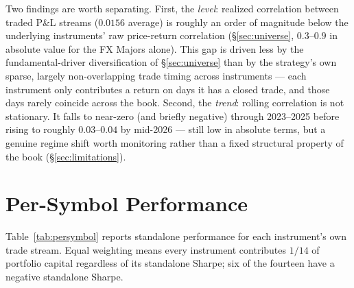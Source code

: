 \documentclass[11pt]{article}
\begin{document}
Two findings are worth separating. First, the \emph{level}: realized correlation between traded P\&L
streams ($0.0156$ average) is roughly an order of magnitude below the underlying instruments' raw
price-return correlation (\S\ref{sec:universe}, $0.3$--$0.9$ in absolute value for the FX Majors
alone). This gap is driven less by the fundamental-driver diversification of \S\ref{sec:universe} than
by the strategy's own sparse, largely non-overlapping trade timing across instruments --- each
instrument only contributes a return on days it has a closed trade, and those days rarely coincide
across the book. Second, the \emph{trend}: rolling correlation is not stationary. It falls to
near-zero (and briefly negative) through 2023--2025 before rising to roughly $0.03$--$0.04$ by
mid-2026 --- still low in absolute terms, but a genuine regime shift worth monitoring rather than a
fixed structural property of the book (\S\ref{sec:limitations}).

\section{Per-Symbol Performance}
\label{sec:persymbol}
Table~\ref{tab:persymbol} reports standalone performance for each instrument's own trade stream.
Equal weighting means every instrument contributes $1/14$ of portfolio capital regardless of its
standalone Sharpe; six of the fourteen have a negative standalone Sharpe.
\end{document}
